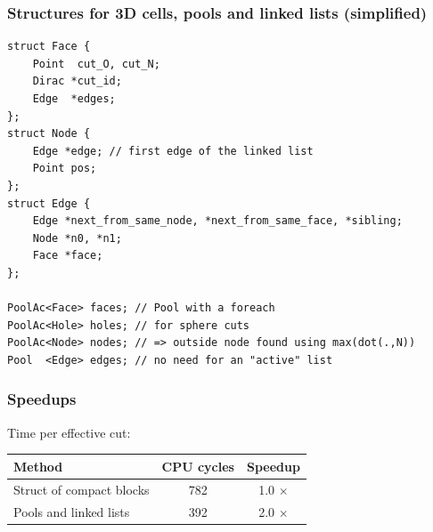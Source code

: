\documentclass[aspectratio=169]{beamer}
\begin{document}

\begin{frame}[fragile]
    \frametitle{Structures for 3D cells, pools and linked lists (simplified)}

\begin{footnotesize}
\begin{lstlisting} 
struct Face {
    Point  cut_O, cut_N;
    Dirac *cut_id;
    Edge  *edges;    
};
struct Node {
    Edge *edge; // first edge of the linked list
    Point pos;
};
struct Edge {
    Edge *next_from_same_node, *next_from_same_face, *sibling;
    Node *n0, *n1;  
    Face *face;
};

PoolAc<Face> faces; // Pool with a foreach
PoolAc<Hole> holes; // for sphere cuts
PoolAc<Node> nodes; // => outside node found using max(dot(.,N))
Pool  <Edge> edges; // no need for an "active" list 
\end{lstlisting}
\end{footnotesize}
\end{frame}

\begin{frame}
    \frametitle{Speedups}

    Time per effective cut:

    \medskip
    \begin{center}    
    \begin{tabular}{|l|c|c|}
        \hline
        Method                   & CPU cycles & Speedup    \\
        \hline
        Struct of compact blocks & 782        & 1.0 $\times$ \\
        Pools and linked lists   & 392        & 2.0 $\times$ \\
        \hline
    \end{tabular}
    \end{center}
\end{frame}
\end{document}
